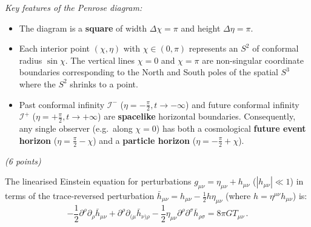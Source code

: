 \documentclass[12pt]{article}
\newcommand{\be}{\begin{equation}}
\newcommand{\ee}{\end{equation}}
\newcommand{\bh}{\bar{h}}
\newcounter{quesno}
\newcommand{\ques}[1]{\vspace{2.5em}\stepcounter{quesno}
\noindent{\bf\large Question \thequesno.} \emph{(#1 points)}\par\vspace{0.5em}
}
\begin{document}
\begin{enumerate}[label=\alph*)]
\noindent
\emph{Key features of the Penrose diagram:}
\begin{itemize}
\item The diagram is a \textbf{square} of width $\Delta\chi = \pi$ and height $\Delta\eta = \pi$.
\item Each interior point $(\chi, \eta)$ with $\chi \in (0,\pi)$ represents an $S^2$ of conformal radius $\sin\chi$. The vertical lines $\chi = 0$ and $\chi = \pi$ are non-singular coordinate boundaries corresponding to the North and South poles of the spatial $S^3$ where the $S^2$ shrinks to a point.
\item Past conformal infinity $\mathcal{I}^-$ ($\eta = -\frac{\pi}{2}, t \to -\infty$) and future conformal infinity $\mathcal{I}^+$ ($\eta = +\frac{\pi}{2}, t \to +\infty$) are \textbf{spacelike} horizontal boundaries. Consequently, any single observer (e.g.\ along $\chi = 0$) has both a cosmological \textbf{future event horizon} ($\eta = \frac{\pi}{2} - \chi$) and a \textbf{particle horizon} ($\eta = -\frac{\pi}{2} + \chi$).
\end{itemize}
\end{enumerate}


\ques{6}
The linearised Einstein equation for perturbations $g_{\mu\nu} = \eta_{\mu\nu} + h_{\mu\nu}$ ($|h_{\mu\nu}| \ll 1$) in terms of the trace-reversed perturbation $\bh_{\mu\nu} = h_{\mu\nu} - \frac{1}{2} h \eta_{\mu\nu}$ (where $h = \eta^{\mu\nu} h_{\mu\nu}$) is:
\be
- \frac{1}{2} \partial^\rho\partial_\rho \bh_{\mu\nu} + \partial^\rho \partial_{(\mu} \bh_{\nu)\rho}
- \frac{1}{2} \eta_{\mu\nu} \partial^\rho \partial^\sigma \bh_{\rho\sigma} = 8 \pi G T_{\mu\nu} \,.
\label{eq:lin_einstein}
\ee
\end{document}
